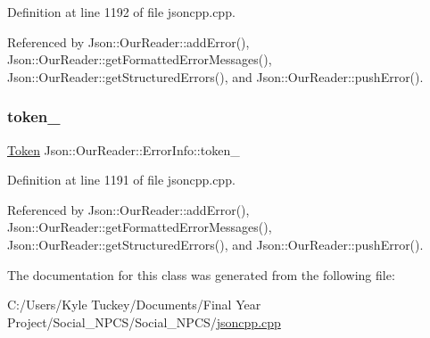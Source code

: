 Definition at line 1192 of file jsoncpp.\+cpp.



Referenced by Json\+::\+Our\+Reader\+::add\+Error(), Json\+::\+Our\+Reader\+::get\+Formatted\+Error\+Messages(), Json\+::\+Our\+Reader\+::get\+Structured\+Errors(), and Json\+::\+Our\+Reader\+::push\+Error().

\mbox{\label{class_json_1_1_our_reader_1_1_error_info_ad05204ecabe5e7201a842935b874ae9a}} 
\subsubsection{\texorpdfstring{token\+\_\+}{token\_}}
{\footnotesize\ttfamily \hyperlink{class_json_1_1_our_reader_1_1_token}{Token} Json\+::\+Our\+Reader\+::\+Error\+Info\+::token\+\_\+}



Definition at line 1191 of file jsoncpp.\+cpp.



Referenced by Json\+::\+Our\+Reader\+::add\+Error(), Json\+::\+Our\+Reader\+::get\+Formatted\+Error\+Messages(), Json\+::\+Our\+Reader\+::get\+Structured\+Errors(), and Json\+::\+Our\+Reader\+::push\+Error().



The documentation for this class was generated from the following file\+:\begin{DoxyCompactItemize}
\item 
C\+:/\+Users/\+Kyle Tuckey/\+Documents/\+Final Year Project/\+Social\+\_\+\+N\+P\+C\+S/\+Social\+\_\+\+N\+P\+C\+S/\hyperlink{jsoncpp_8cpp}{jsoncpp.\+cpp}\end{DoxyCompactItemize}
